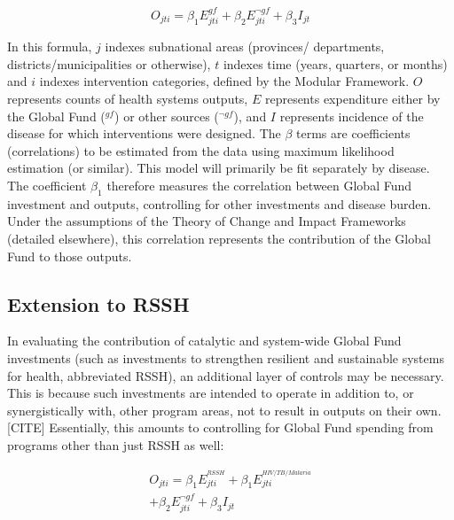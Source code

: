 \documentclass[twocolumn]{bmcart}%
\begin{document}
\begin{equation} \label{basic_model}
O_{jti} = \beta_1 E^{gf}_{jti} + \beta_2 E^{\neg gf}_{jti} + \beta_3 I_{jt}
\end{equation}

In this formula, $j$ indexes subnational areas (provinces/ departments, districts/municipalities or otherwise), $t$ indexes time (years, quarters, or months) and $i$ indexes intervention categories, defined by the Modular Framework. $O$ represents counts of health systems outputs, $E$ represents expenditure either by the Global Fund ($^{gf}$) or other sources ($^{\neg gf}$), and $I$ represents incidence of the disease for which interventions were designed. The $\beta$ terms are coefficients (correlations) to be estimated from the data using maximum likelihood estimation (or similar). This model will primarily be fit separately by disease.\\

The coefficient $\beta_1$ therefore measures the correlation between Global Fund investment and outputs, controlling for other investments and disease burden. Under the assumptions of the Theory of Change and Impact Frameworks (detailed elsewhere), this correlation represents the contribution of the Global Fund to those outputs.

\subsection{Extension to RSSH}
In evaluating the contribution of catalytic and system-wide Global Fund investments (such as investments to strengthen resilient and sustainable systems for health, abbreviated RSSH), an additional layer of controls may be necessary. This is because such investments are intended to operate in addition to, or synergistically with, other program areas, not to result in outputs on their own.[CITE] %
 Essentially, this amounts to controlling for Global Fund spending from programs other than just RSSH as well:

  \begin{align}
    O_{jti} = \beta_1 E^{^{RSSH}}_{jti} + \beta_1 E^{^{HIV/TB/Malaria}}_{jti} \\
    + \beta_2 E^{\neg gf}_{jti} + \beta_3 I_{jt}
  \end{align}
\end{document}
